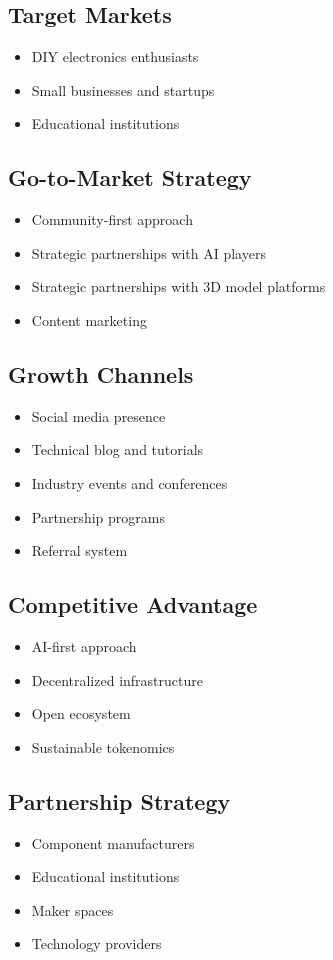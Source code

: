 \subsection{Target Markets}
\begin{itemize}[leftmargin=*]
    \item DIY electronics enthusiasts
    \item Small businesses and startups
    \item Educational institutions
\end{itemize}

\subsection{Go-to-Market Strategy}
\begin{itemize}[leftmargin=*]
    \item Community-first approach
    \item Strategic partnerships with AI players
    \item Strategic partnerships with 3D model platforms
    \item Content marketing
\end{itemize}

\subsection{Growth Channels}
\begin{itemize}[leftmargin=*]
    \item Social media presence
    \item Technical blog and tutorials
    \item Industry events and conferences
    \item Partnership programs
    \item Referral system
\end{itemize}

\subsection{Competitive Advantage}
\begin{itemize}[leftmargin=*]
    \item AI-first approach
    \item Decentralized infrastructure
    \item Open ecosystem
    \item Sustainable tokenomics
\end{itemize}

\subsection{Partnership Strategy}
\begin{itemize}[leftmargin=*]
    \item Component manufacturers
    \item Educational institutions
    \item Maker spaces
    \item Technology providers
\end{itemize} 